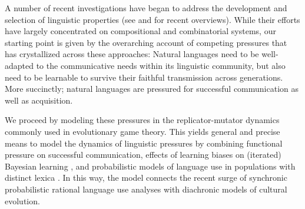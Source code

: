 \documentclass[a4paper]{article}
\begin{document}
A number of recent investigations have began to address the development and selection of linguistic properties (see \citealt{steels:2015} and \citealt{tamariz+kirby:2016} for recent overviews). While their efforts have largely concentrated on compositional and combinatorial systems, our starting point is given by the overarching account of competing pressures that has crystallized across these approaches: Natural languages need to be well-adapted to the communicative needs within its linguistic community, but also need to be learnable to survive their faithful transmission across generations. More succinctly; natural languages are pressured for successful communication as well as acquisition.

We proceed by modeling these pressures in the replicator-mutator dynamics commonly used in evolutionary game theory. This yields general and precise means to model the dynamics of linguistic pressures by combining functional pressure on successful communication, effects of learning biases on (iterated) Bayesian learning \citep{griffiths+kalish:2007}, and  probabilistic models of language use in populations with distinct lexica \citep{frank+goodman:2012,franke+jaeger:2014, bergen+etal:2016}. In this way, the model connects the recent surge of synchronic probabilistic rational language use analyses with diachronic models of cultural evolution. %

\end{document}

